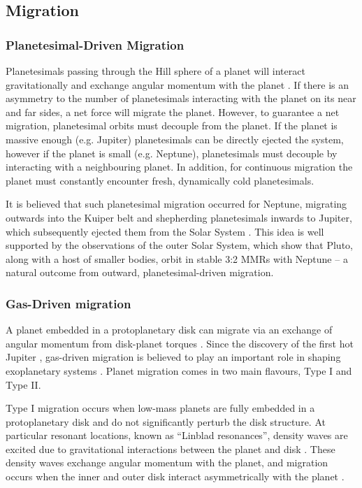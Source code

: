 \documentclass[12pt,letter]{aastex}
\begin{document}
\subsection{Migration}
\subsubsection{Planetesimal-Driven Migration}
Planetesimals passing through the Hill sphere of a planet will interact gravitationally and exchange angular momentum with the planet \citep{Ida2000, Kirsh2009}.
If there is an asymmetry to the number of planetesimals interacting with the planet on its near and far sides, a net force will migrate the planet. 
However, to guarantee a net migration, planetesimal orbits must decouple from the planet. 
If the planet is massive enough (e.g. Jupiter) planetesimals can be directly ejected the system, however if the planet is small (e.g. Neptune), planetesimals must decouple by interacting with a neighbouring planet. 
In addition, for continuous migration the planet must constantly encounter fresh, dynamically cold planetesimals.  

It is believed that such planetesimal migration occurred for Neptune, migrating outwards into the Kuiper belt and shepherding planetesimals inwards to Jupiter, which subsequently ejected them from the Solar System \citep{Fernandez1984}.
This idea is well supported by the observations of the outer Solar System, which show that Pluto, along with a host of smaller bodies, orbit in stable 3:2 MMRs with Neptune \citep{Malhotra1993, Malhotra1995} -- a natural outcome from outward, planetesimal-driven migration. 

\subsubsection{Gas-Driven migration}
A planet embedded in a protoplanetary disk can migrate via an exchange of angular momentum from disk-planet torques \citep{Goldreich1980}.
Since the discovery of the first hot Jupiter \citep{Mayor1995}, gas-driven migration is believed to play an important role in shaping exoplanetary systems \citep{Lin1996}.
Planet migration comes in two main flavours, Type I and Type II. 

Type I migration occurs when low-mass planets are fully embedded in a protoplanetary disk and do not significantly perturb the disk structure. 
At particular resonant locations, known as ``Linblad resonances'', density waves are excited due to gravitational interactions between the planet and disk \citep{Goldreich1979}. 
These density waves exchange angular momentum with the planet, and migration occurs when the inner and outer disk interact asymmetrically with the planet \citep{Goldreich1979}.
\end{document}
